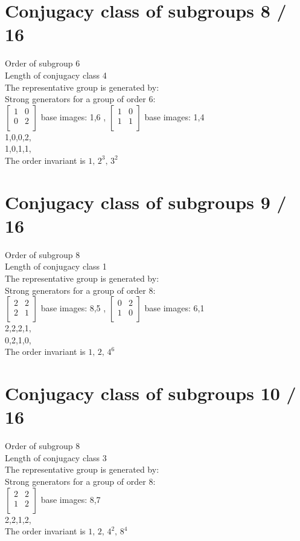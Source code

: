 \section{Conjugacy class of subgroups 8 / 16}
Order of subgroup 6\\
Length of conjugacy class 4\\
The representative group is generated by:\\
Strong generators for a group of order 6:\\
$
\left[
\begin{array}{*{2}{r}}
1 & 0\\
0 & 2\\
\end{array}
\right]
$
base images: 1,6 , 
$
\left[
\begin{array}{*{2}{r}}
1 & 0\\
1 & 1\\
\end{array}
\right]
$
base images: 1,4 \\
1,0,0,2,\\
1,0,1,1,\\
The order invariant is $1,\,2^3,\,3^2$\\
\section{Conjugacy class of subgroups 9 / 16}
Order of subgroup 8\\
Length of conjugacy class 1\\
The representative group is generated by:\\
Strong generators for a group of order 8:\\
$
\left[
\begin{array}{*{2}{r}}
2 & 2\\
2 & 1\\
\end{array}
\right]
$
base images: 8,5 , 
$
\left[
\begin{array}{*{2}{r}}
0 & 2\\
1 & 0\\
\end{array}
\right]
$
base images: 6,1 \\
2,2,2,1,\\
0,2,1,0,\\
The order invariant is $1,\,2,\,4^6$\\
\section{Conjugacy class of subgroups 10 / 16}
Order of subgroup 8\\
Length of conjugacy class 3\\
The representative group is generated by:\\
Strong generators for a group of order 8:\\
$
\left[
\begin{array}{*{2}{r}}
2 & 2\\
1 & 2\\
\end{array}
\right]
$
base images: 8,7 \\
2,2,1,2,\\
The order invariant is $1,\,2,\,4^2,\,8^4$\\
